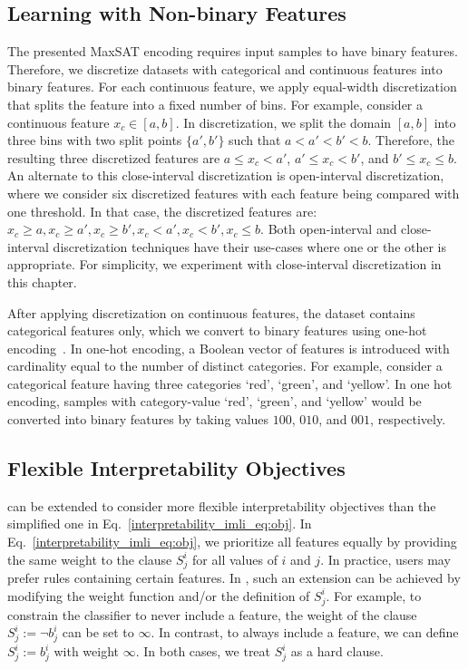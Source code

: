 \subsection{Learning with Non-binary Features}
	\label{interpretability_imli_sec:non-binary}
	The presented MaxSAT encoding requires input samples to have binary features. Therefore, we discretize datasets with categorical and continuous features into binary features. For each continuous feature, we apply equal-width discretization that splits the feature into a fixed number of bins. For example, consider a continuous feature $ x_c \in [a,b] $. In discretization, we split the domain $ [a,b] $ into three bins with two split points $ \{a',b'\} $ such that $ a<a'<b'<b $.  Therefore, the resulting three discretized features are $ { a \le x_c < a'} $, $ {a' \le x_c < b'} $, and $ { b' \le x_c  \le b } $. An alternate to this close-interval discretization is open-interval discretization, where we consider six discretized features with each feature being compared with one threshold. In that case, the discretized features are: $ x_c \ge a, x_c \ge a', x_c \ge b', x_c < a', x_c < b', x_c \le b $. Both open-interval and close-interval discretization techniques have their use-cases where one or the other is appropriate. For simplicity, we experiment with close-interval discretization in this chapter.
	
	After applying discretization on continuous features, the dataset contains categorical features only, which we convert to binary features using one-hot encoding~\cite{lakkaraju2019faithful}. In one-hot encoding, a Boolean vector of features is introduced with cardinality equal to the number of distinct categories. For example, consider a categorical feature having three categories `red', `green', and `yellow'. In one hot encoding, samples with category-value `red', `green', and `yellow' would be converted into binary features by taking values $ 100 $, $ 010 $, and $ 001 $, respectively. 
	
	
\subsection{Flexible Interpretability Objectives}
\label{interpretability_imli_sec:complex_interpretability_objectives}
{\imli} can be extended to consider more flexible interpretability objectives than the simplified one in Eq.~\eqref{interpretability_imli_eq:obj}. In Eq.~\eqref{interpretability_imli_eq:obj}, we prioritize all features equally by providing the same weight to the clause $ S_j^i $ for all  values of $ i $ and $ j $. In practice, users may prefer rules containing certain features. In {\imli}, such an extension can be achieved by modifying the weight function and/or the definition of  $ S_j^i $. For example, to constrain the classifier to never include a feature, the weight of the clause $ S_j^i := \neg b_j^i $ can be set to $ \infty $. In contrast, to always include a feature, we can define $ S_j^i := b_j^i $ with weight $ \infty $. In both cases, we treat $ S_j^i $ as a hard clause. 

